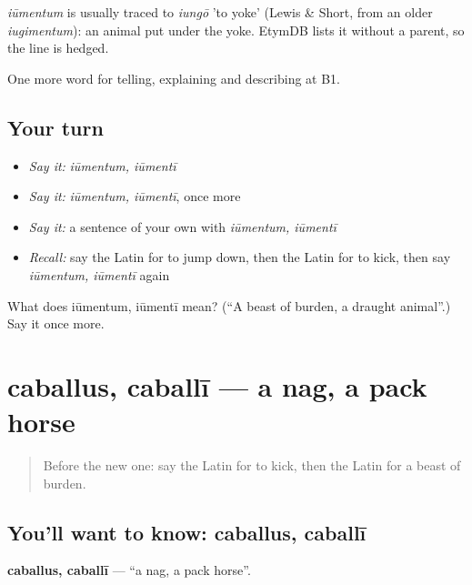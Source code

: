 \begin{cousinweb}
\emph{iūmentum} is usually traced to \emph{iungō} 'to yoke' (Lewis \& Short, from an older \emph{iugimentum}): an animal put under the yoke. EtymDB lists it without a parent, so the line is hedged.
\end{cousinweb}

\begin{grammarlens}[title={What you've built}]
One more word for telling, explaining and describing at B1.
\end{grammarlens}

\subsection*{Your turn}
\begin{itemize}
\raggedright
  \item \emph{Say it:} \emph{iūmentum, iūmentī}
  \item \emph{Say it:} \emph{iūmentum, iūmentī}, once more
  \item \emph{Say it:} a sentence of your own with \emph{iūmentum, iūmentī}
  \item \emph{Recall:} say the Latin for to jump down, then the Latin for to kick, then say \emph{iūmentum, iūmentī} again
\end{itemize}

\begin{tcolorbox}[breakable,colback=teal!4,colframe=teal!35!black,title={Before you move on}]
What does iūmentum, iūmentī mean? (\textquotedblleft{}A beast of burden, a draught animal\textquotedblright{}.) Say it once more.
\end{tcolorbox}
\section[caballus, caballī]{caballus, caballī — a nag, a pack horse}

\label{lesson:LA-C433-caballus}



\begin{quote}
Before the new one: say the Latin for to kick, then the Latin for a beast of burden.
\end{quote}

\subsection*{You'll want to know: caballus, caballī}
\textbf{caballus, caballī} — \textquotedblleft{}a nag, a pack horse\textquotedblright{}.

